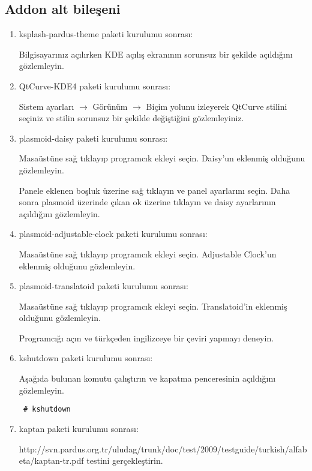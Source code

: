 \documentclass[a4paper,10pt]{article}
\begin{document}
\subsection*{Addon alt bileşeni}
\begin{enumerate}
\item  ksplash-pardus-theme paketi kurulumu sonrası:

Bilgisayarınız açılırken KDE açılış ekranının sorunsuz bir şekilde açıldığını gözlemleyin.
 \item  QtCurve-KDE4 paketi kurulumu sonrası:

Sistem ayarları $\rightarrow$ Görünüm $\rightarrow$ Biçim yolunu izleyerek QtCurve stilini seçiniz ve stilin sorunsuz bir şekilde değiştiğini gözlemleyiniz.
\item plasmoid-daisy paketi kurulumu sonrası:

Masaüstüne sağ tıklayıp programcık ekleyi seçin. Daisy'un eklenmiş olduğunu gözlemleyin.

Panele eklenen boşluk üzerine sağ tıklayın ve panel ayarlarını seçin. Daha sonra plasmoid üzerinde çıkan ok üzerine tıklayın ve daisy ayarlarının açıldığını gözlemleyin.

 \item plasmoid-adjustable-clock paketi kurulumu sonrası:

Masaüstüne sağ tıklayıp programcık ekleyi seçin. Adjustable Clock'un eklenmiş olduğunu gözlemleyin.


 \item plasmoid-translatoid paketi kurulumu sonrası:

Masaüstüne sağ tıklayıp programcık ekleyi seçin. Translatoid'in eklenmiş olduğunu gözlemleyin.

Programcığı açın ve türkçeden ingilizceye bir çeviri yapmayı deneyin.
 \item kshutdown paketi kurulumu sonrası:

Aşağıda bulunan komutu çalıştırın ve kapatma penceresinin açıldığını gözlemleyin.
\begin{verbatim}
 # kshutdown 
\end{verbatim}

 \item kaptan paketi kurulumu sonrası:

  http://svn.pardus.org.tr/uludag/trunk/doc/test/2009/testguide/turkish/alfabeta/kaptan-tr.pdf testini gerçekleştirin.

\end{enumerate}
\end{document}
